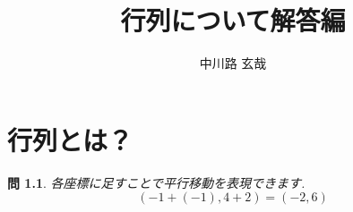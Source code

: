 \documentclass[a4paper,12pt]{jreport}
\title{行列について解答編}
\author{中川路 玄哉}
\newtheorem{problem}{問}[chapter]
\theoremstyle{definition}
\begin{document}
\chapter{行列とは？}
\begin{problem}
    各座標に足すことで平行移動を表現できます.
    $$
    (-1+(-1),4+2)=(-2,6)
    $$
\end{problem}
\end{document}
